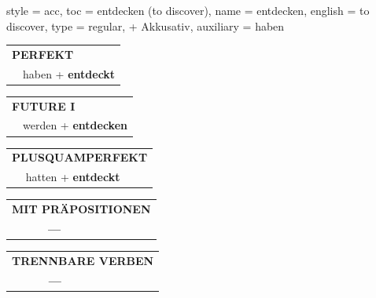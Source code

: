 \begin{verbentry}{
  style = {acc},
  toc = {entdecken (to discover)},
  name = {entdecken},
  english = {to discover},
  type = {regular, + Akkusativ},
  auxiliary = {haben}
}
\vspace{10pt}

\begin{tabular}{rl}
\multicolumn{2}{l}{\textbf{PERFEKT}}\\
& haben + \textbf{entdeckt}\\
\end{tabular}
\hfill
\begin{tabular}{rl}
\multicolumn{2}{l}{\textbf{FUTURE I}}\\
& werden + \textbf{entdecken}\\
\end{tabular}
\hfill
\begin{tabular}{rl}
\multicolumn{2}{l}{\textbf{PLUSQUAMPERFEKT}}\\
& hatten + \textbf{entdeckt}\\
\end{tabular}

\vspace{10pt}

\begin{tabular}{lll}
\multicolumn{3}{l}{\textbf{MIT PRÄPOSITIONEN}}\\
& \textbf{---} & \\
\end{tabular}
\hfill
\begin{tabular}{lll}
\multicolumn{3}{l}{\textbf{TRENNBARE VERBEN}}\\
& \textbf{---} & \\
\end{tabular}

\vspace{-5pt}
\end{verbentry}

